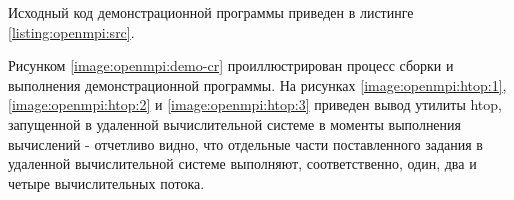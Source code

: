 Исходный код демонстрационной программы приведен в листинге \ref{listing:openmpi:src}.

Рисунком \ref{image:openmpi:demo-cr} проиллюстрирован процесс сборки и выполнения демонстрационной программы. На рисунках \ref{image:openmpi:htop:1}, \ref{image:openmpi:htop:2} и \ref{image:openmpi:htop:3} приведен вывод утилиты htop, запущенной в удаленной вычислительной системе в моменты выполнения вычислений - отчетливо видно, что отдельные части поставленного задания в удаленной вычислительной системе выполняют, соответственно, один, два и четыре вычислительных потока.



